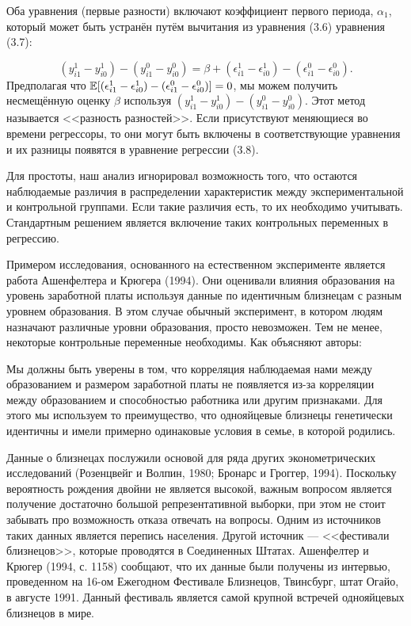 Оба уравнения (первые разности) включают коэффициент первого периода, $\alpha_{1}$, который может быть устранён путём вычитания из уравнения (3.6) уравнения (3.7):

\begin{equation}
(y^{1}_{i1}-y^{1}_{i0})-(y^{0}_{i1}-y^{0}_{i0})=\beta+(\epsilon^{1}_{i1}-\epsilon^{1}_{i0})-(\epsilon^{0}_{i1}-\epsilon^{0}_{i0}).
\end{equation}
Предполагая что $\mathbb{E}[(\epsilon^{1}_{i1}-\epsilon^{1}_{i0})-(\epsilon^{0}_{i1}-\epsilon^{0}_{i0})]=0$, мы можем получить несмещённую оценку $\beta$ используя $(y^{1}_{i1}-y^{1}_{i0})-(y^{0}_{i1}-y^{0}_{i0})$. Этот метод называется <<разность разностей>>. Если присутствуют меняющиеся во времени регрессоры, то они могут быть включены в соответствующие уравнения и их разницы появятся в уравнение регрессии (3.8).


Для простоты, наш анализ игнорировал возможность того, что остаются наблюдаемые различия в распределении характеристик между экспериментальной и контрольной группами. Если такие различия есть, то их необходимо учитывать. Стандартным решением является включение таких контрольных переменных в регрессию.


Примером исследования, основанного на естественном эксперименте является работа Ашенфелтера и Крюгера (1994). Они оценивали влияния образования на уровень заработной платы используя данные по идентичным близнецам с разным уровнем образования. В этом случае обычный эксперимент, в котором людям назначают различные уровни образования, просто невозможен. Тем не менее, некоторые контрольные переменные необходимы. Как объясняют авторы:


Мы должны быть уверены в том, что корреляция наблюдаемая нами между образованием и размером заработной платы не появляется из-за корреляции между образованием и способностью работника или другим признаками. Для этого мы используем то преимущество, что однояйцевые близнецы генетически идентичны и имели примерно одинаковые условия в семье, в которой родились.


Данные о близнецах послужили основой для ряда других эконометрических исследований (Розенцвейг и Волпин, 1980; Бронарс и Гроггер, 1994). Поскольку вероятность рождения двойни  не является высокой, важным вопросом  является получение достаточно большой репрезентативной выборки, при этом не стоит забывать про возможность отказа отвечать на вопросы. Одним из источников таких данных является перепись населения. Другой источник --- <<фестивали близнецов>>, которые проводятся в Соединенных Штатах. Ашенфелтер и Крюгер (1994, с. 1158) сообщают, что их данные были получены из интервью, проведенном на 16-ом Ежегодном Фестивале Близнецов, Твинсбург, штат Огайо, в августе 1991. Данный фестиваль является самой крупной встречей однояйцевых близнецов в мире.


